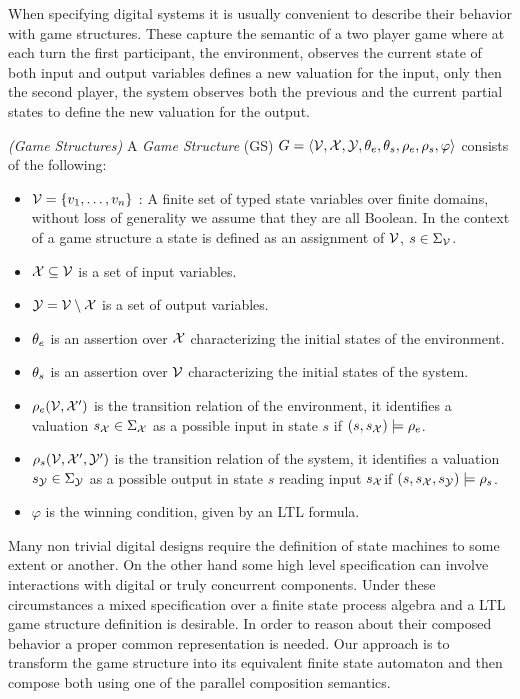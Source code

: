 When specifying digital systems it is usually convenient to describe their behavior with game structures. These capture the semantic of a two player game where at each turn the first participant, the environment, observes the current state of both input and output variables defines a new valuation for the input, only then the second player, the system observes both the previous and the current partial states to define the new valuation for the output. 

\begin{definition}
	\label{def:GS} \emph{(Game Structures)} 
	A \emph{Game Structure} (GS) $G =  \langle {\mathcal{V}}, {\mathcal{X}}, {\mathcal{Y}}, {\theta_e}, {\theta_s}, {\rho_e}, {\rho_s}, \varphi \rangle$ consists of the following:
	\begin{itemize}
		\item ${\mathcal{V}} = \{v_1,\ldots,v_n\}$ : A finite set of typed state variables over finite domains, without loss of generality we assume that they are all Boolean. In the context of a game structure a state is defined as an assignment of ${\mathcal{V}}$, $s \in \Sigma_{{\mathcal{V}}}$.
		\item ${\mathcal{X}} \subseteq {\mathcal{V}}$ is a set of input variables.
		\item ${\mathcal{Y}} = {\mathcal{V}} \setminus {\mathcal{X}}$ is a set of output variables.
		\item ${\theta_e}$ is an assertion over ${\mathcal{X}}$ characterizing the initial states of the environment.
		\item ${\theta_s}$ is an assertion over ${\mathcal{V}}$ characterizing the initial states of the system.		
		\item ${\rho_e}({\mathcal{V}},{\mathcal{X}}')$ is the transition relation of the environment, it identifies a valuation $s_{{\mathcal{X}}} \in \Sigma_{{\mathcal{X}}}$ as a possible input in state $s$ if $(s,s_{{\mathcal{X}}}) \models {\rho_e}$.
		\item ${\rho_s}({\mathcal{V}},{\mathcal{X}}',{\mathcal{Y}}')$ is the transition relation of the system, it identifies a valuation $s_{{\mathcal{Y}}} \in \Sigma_{{\mathcal{Y}}}$ as a possible output in state $s$ reading input $s_{{\mathcal{X}}} $if $(s,s_{{\mathcal{X}}}, s_{{\mathcal{Y}}}) \models {\rho_s}$.		
		\item $\varphi$ is the winning condition, given by an LTL formula.
	\end{itemize} 
\end{definition}

Many non trivial digital designs require the definition of state machines to some extent or another. On the other hand some high level specification can involve interactions with digital or truly concurrent components. Under these circumstances a mixed specification over a finite state process algebra and a LTL game structure definition is desirable.  In order to reason about their composed behavior a proper common representation is needed. Our approach is to transform the game structure into its equivalent finite state automaton and then compose both using one of the parallel composition semantics.